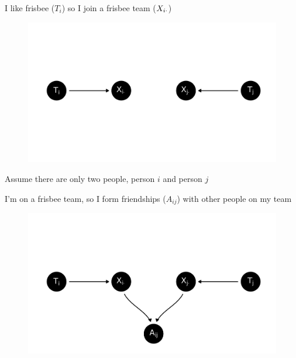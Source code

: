 \documentclass{beamer}
\theoremstyle{remark}
\begin{document}
\begin{frame}{I like frisbee ($T_i$) so I join a frisbee team ($X_{i \cdot}$)}

    \centering

    \begin{figure}
        \includegraphics[scale=0.65]{figures/dags/mediating-1.png}
        \label{fig:mediating-1}
    \end{figure}

    Assume there are only two people, person $i$ and person $j$

\end{frame}

\begin{frame}{I'm on a frisbee team, so I form friendships ($A_{ij}$) with other people on my team}

    \centering

    \begin{figure}
        \includegraphics[scale=0.65]{figures/dags/mediating-2.png}
        \label{fig:mediating-2}
    \end{figure}

\end{frame}
\end{document}
